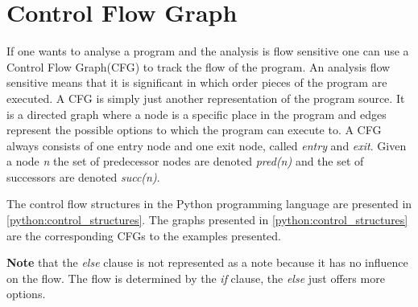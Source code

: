 \section{Control Flow Graph}\label{control_flow_graph}
If one wants to analyse a program and the analysis is flow sensitive one can use a Control Flow Graph(CFG) to track the flow of the program.
An analysis flow sensitive means that it is significant in which order pieces of the program are executed.
A CFG is simply just another representation of the program source.
It is a directed graph where a node is a specific place in the program and edges represent the possible options to which the program can execute to.
A CFG always consists of one entry node and one exit node, called \textit{entry} and \textit{exit}.
Given a node \textit{n} the set of predecessor nodes are denoted \textit{pred(n)} and the set of successors are denoted \textit{succ(n)}.

The control flow structures in the Python programming language are presented in \cref{python:control_structures}.
The graphs presented in \cref{python:control_structures} are the corresponding CFGs to the examples presented.

\textbf{Note} that the \textit{else} clause is not represented as a note because it has no influence on the flow.
The flow is determined by the \textit{if} clause, the \textit{else} just offers more options.

